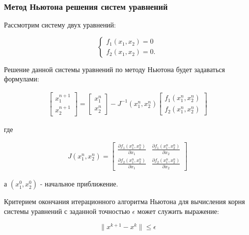 \subsubsection{Метод Ньютона решения систем уравнений}
Рассмотрим систему двух уравнений:
\begin{center}
\begin{equation}
	\label{eq:newton_system}
		\begin{cases}
			f_1(x_1, x_2) = 0 \\
			f_2(x_1, x_2) = 0.
		\end{cases}
\end{equation}
\end{center}

Решение данной системы уравнений по методу Ньютона будет задаваться формулами:
\begin{center}
\begin{eqnarray}
	\label{eq:eq:newton_system_2}
		\left[ \begin{array}{c}
			x_1^{n+1} \\
			x_2^{n+1}
		\end{array} \right]
	=
		\left[ \begin{array}{c}
			x_1^{n} \\
			x_2^{n}
		\end{array} \right]
	- J^{-1} (x_1^n, x_2^n)
		\left[ \begin{array}{c}
			f_1(x_1^n, x_2^n) \\
			f_2(x_1^n, x_2^n)
		\end{array} \right]
\end{eqnarray}
\end{center}
где 
\begin{center}
\begin{eqnarray}
	\label{eq:eq:newton_system_3}
	J(x_1^n, x_2^n) = 
		\left[ \begin{array}{cc}
			\frac{\partial f_1 (x_1^n, x_2^n)}{\partial x_1} & \frac{\partial f_1 (x_1^n, x_2^n)}{\partial x_2} \\
			\frac{\partial f_2 (x_1^n, x_2^n)}{\partial x_1} & \frac{\partial f_2 (x_1^n, x_2^n)}{\partial x_2}
		\end{array} \right]
\end{eqnarray}
\end{center}
а ${(x_1^0, x_2^0)}$ - начальное приближение.

Критерием окончания итерационного алгоритма Ньютона для вычисления корня системы уравнений с заданной точностью ${\epsilon}$ может служить выражение:
\begin{center}
\begin{equation}
	\label{eq:newton_system_4}
	\|x^{k+1} - x^k\| \leq \epsilon
\end{equation}
\end{center}



\newpage
